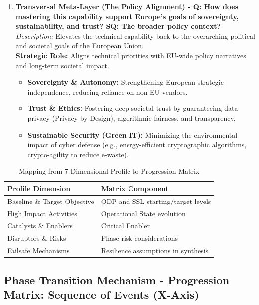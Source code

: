 \documentclass{ieeeaccess}
\begin{document}
\begin{enumerate}
    \item \textbf{Transversal Meta-Layer (The Policy Alignment) - Q: How does mastering this capability support Europe's goals of sovereignty, sustainability, and trust? SQ: The broader policy context?}\\
    \textit{Description:} Elevates the technical capability back to the overarching political and societal goals of the European Union.\\
    \textbf{Strategic Role:} Aligns technical priorities with EU-wide policy narratives and long-term societal impact.
    \begin{itemize}
        \item \textbf{Sovereignty \& Autonomy:} Strengthening European strategic independence, reducing reliance on non-EU vendors.
        \item \textbf{Trust \& Ethics:} Fostering deep societal trust by guaranteeing data privacy (Privacy-by-Design), algorithmic fairness, and transparency.
        \item \textbf{Sustainable Security (Green IT):} Minimizing the environmental impact of cyber defense (e.g., energy-efficient cryptographic algorithms, crypto-agility to reduce e-waste).
    \end{itemize}
\end{enumerate}

\begin{table}[h!]
\centering
\caption{Mapping from 7-Dimensional Profile to Progression Matrix}
\begin{tabular}{p{5cm} p{6cm}}
\toprule
\textbf{Profile Dimension} & \textbf{Matrix Component} \\
\midrule
Baseline \& Target Objective & ODP and SSL starting/target levels \\
High Impact Activities & Operational State evolution \\
Catalysts \& Enablers & Critical Enabler \\
Disruptors \& Risks & Phase risk considerations \\
Failsafe Mechanisms & Resilience assumptions in synthesis \\
\bottomrule
\end{tabular}
\end{table}

\subsection{Phase Transition Mechanism - Progression Matrix: Sequence of Events (X-Axis)}
\end{document}
